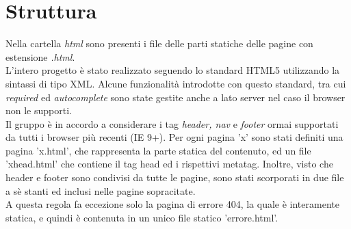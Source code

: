 \section{Struttura}
Nella cartella \textit{html} sono presenti i file delle parti statiche delle pagine con estensione \textit{.html}.\\
L'intero progetto è stato realizzato seguendo lo standard HTML5 utilizzando la sintassi di tipo XML. Alcune funzionalità introdotte con questo standard, tra cui \textit{required} ed \textit{autocomplete} sono state gestite anche a lato server nel caso il browser non le supporti.\\
Il gruppo è in accordo a considerare i tag \textit{header, nav} e \textit{footer} ormai supportati da tutti i browser più recenti (IE 9+).
Per ogni pagina 'x' sono stati definiti una pagina 'x.html', che rappresenta la parte statica del contenuto, ed un file 'x\textunderscore head.html' che contiene il tag head ed i rispettivi metatag. Inoltre, visto che header e footer sono condivisi da tutte le pagine, sono stati scorporati in due file a sè stanti ed inclusi nelle pagine sopracitate. \\
A questa regola fa eccezione solo la pagina di errore 404, la quale è interamente statica, e quindi è contenuta in un unico file statico 'errore.html'.



\newpage